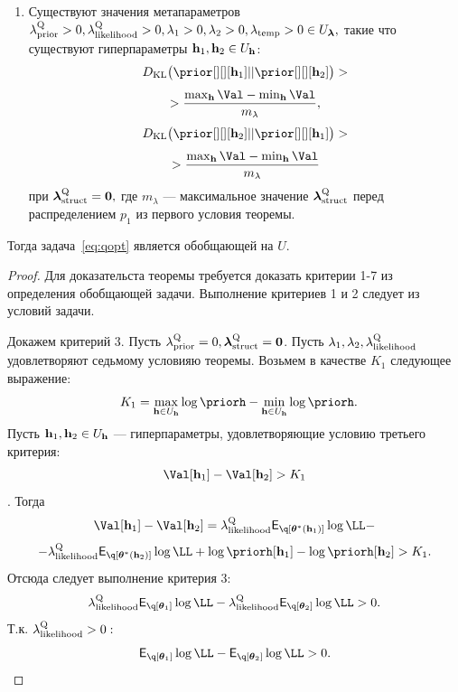 \begin{theorem}
\begin{enumerate}
\item Существуют значения метапараметров $\lambda_\text{prior}^\text{Q}>0,\lambda_\text{likelihood}^\text{Q}>0, \lambda_1>0, \lambda_2>0, \lambda_{\text{temp}}>0  \in U_{\boldsymbol{\lambda}},$ такие что существуют гиперпараметры $\mathbf{h}_1, \mathbf{h}_2 \in U_{\mathbf{h}}$:
\[
\KL{\prior[][][\h_1]}{\prior[][][\h_2]} > 
\]
\[
>\frac{\max_{\h} \Val - \min_{\h} \Val }{m_{\lambda}},
\]
\[
\KL{\prior[][][\h_2]}{\prior[][][\h_1]} >
\]
\[
> \frac{\max_{\h} \Val - \min_{\h} \Val }{m_{\lambda}}
\]
при $\boldsymbol{\lambda}_\text{struct}^\text{Q} = \mathbf{0},$ где $m_{\lambda}$ --- максимальное значение $\boldsymbol{\lambda}_\text{struct}^\text{Q}$ перед распределением $p_1$ из первого условия теоремы.

\end{enumerate}
Тогда задача~\eqref{eq:qopt} является обобщающей на $U$.
\end{theorem}

\begin{proof}
Для доказательста теоремы требуется доказать критерии 1-7 из определения обобщающей задачи.
Выполнение критериев 1 и 2 следует из условий задачи.

Докажем критерий 3. 
Пусть $\lambda_\text{prior}^\text{Q} = 0, \boldsymbol{\lambda}_\text{struct}^\text{Q} = \mathbf{0}$. 
Пусть $\lambda_1, \lambda_2, \lambda_\text{likelihood}^\text{Q}$ удовлетворяют седьмому условияю теоремы.
Возьмем в качестве $K_1$ следующее выражение:
\[
    K_1= \max_{\h \in \Uh} \log \priorh-\min_{\h \in \Uh} \log \priorh.
\]
Пусть $\mathbf{h}_1, \mathbf{h}_2 \in U_{\mathbf{h}}$ --- гиперпараметры, удовлетворяющие условию третьего критерия:
$$ \Val[\h_1] - \Val[\h_2]>K_1$$.
Тогда 
\[
\Val[\h_1] - \Val[\h_2] = \lamLL \E_{\q[\teta^{*}(\h_1)]} \log \LL - 
\]
\[
- \lamLL \E_{\q[\teta^{*}(\h_2)]} \log \LL + \log\priorh[\h_1] - \log\priorh[\h_2]>K_1.
\]
Отсюда следует  выполнение критерия 3:
\[
\lamLL \E_{\q[\teta_1]} \log \LL - \lamLL  \E_{\q[\teta_2]} \log \LL   >0.
\]
Т.к. $\lambda_\text{likelihood}^\text{Q} > 0:$
\[
\E_{\q[\teta_1]} \log \LL -  \E_{\q[\teta_2]} \log \LL   >0.
\]



\end{proof}
